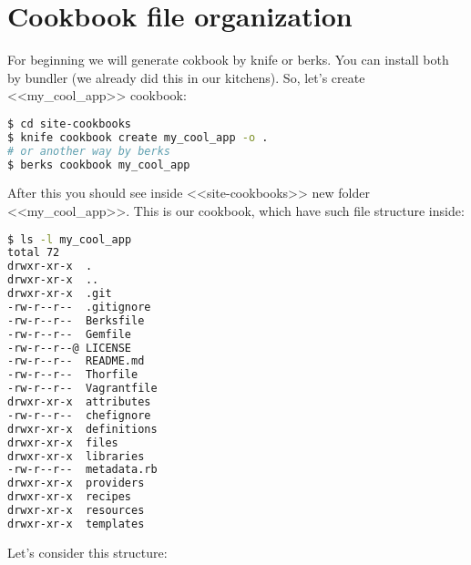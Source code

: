 \section{Cookbook file organization}
\label{sec:cookbook-files}

For beginning we will generate cokbook by knife or berks. You can install both by bundler (we already did this in our kitchens). So, let's create <<my\_cool\_app>> cookbook:

\begin{lstlisting}[language=Bash,label=lst:cookbook-organization1]
$ cd site-cookbooks
$ knife cookbook create my_cool_app -o .
# or another way by berks
$ berks cookbook my_cool_app
\end{lstlisting}

After this you should see inside <<site-cookbooks>> new folder <<my\_cool\_app>>. This is our cookbook, which have such file structure inside:

\begin{lstlisting}[language=Bash,label=lst:cookbook-organization2]
$ ls -l my_cool_app
total 72
drwxr-xr-x  .
drwxr-xr-x  ..
drwxr-xr-x  .git
-rw-r--r--  .gitignore
-rw-r--r--  Berksfile
-rw-r--r--  Gemfile
-rw-r--r--@ LICENSE
-rw-r--r--  README.md
-rw-r--r--  Thorfile
-rw-r--r--  Vagrantfile
drwxr-xr-x  attributes
-rw-r--r--  chefignore
drwxr-xr-x  definitions
drwxr-xr-x  files
drwxr-xr-x  libraries
-rw-r--r--  metadata.rb
drwxr-xr-x  providers
drwxr-xr-x  recipes
drwxr-xr-x  resources
drwxr-xr-x  templates
\end{lstlisting}

Let's consider this structure:

